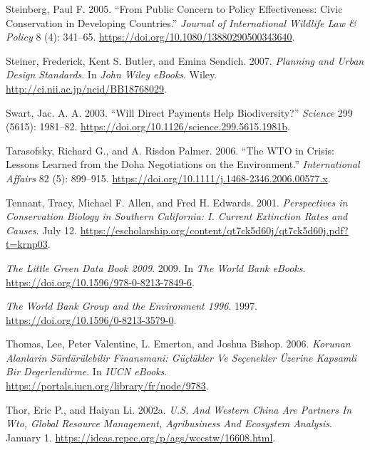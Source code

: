 \begin{CSLReferences}{1}{1}
Steinberg, Paul F. 2005. {``From Public Concern to Policy Effectiveness:
Civic Conservation in Developing Countries.''} \emph{Journal of
International Wildlife Law \& Policy} 8 (4): 341--65.
\url{https://doi.org/10.1080/13880290500343640}.

Steiner, Frederick, Kent S. Butler, and Emina Sendich. 2007.
\emph{Planning and Urban Design Standards}. In \emph{John Wiley eBooks}.
Wiley. \url{http://ci.nii.ac.jp/ncid/BB18768029}.

Swart, Jac. A. A. 2003. {``Will Direct Payments Help Biodiversity?''}
\emph{Science} 299 (5615): 1981--82.
\url{https://doi.org/10.1126/science.299.5615.1981b}.

Tarasofsky, Richard G., and A. Risdon Palmer. 2006. {``The WTO in
Crisis: Lessons Learned from the Doha Negotiations on the
Environment.''} \emph{International Affairs} 82 (5): 899--915.
\url{https://doi.org/10.1111/j.1468-2346.2006.00577.x}.

Tennant, Tracy, Michael F. Allen, and Fred H. Edwards. 2001.
\emph{Perspectives in Conservation Biology in Southern California: I.
Current Extinction Rates and Causes}. July 12.
\url{https://escholarship.org/content/qt7ck5d60j/qt7ck5d60j.pdf?t=krnp03}.

\emph{The Little Green Data Book 2009}. 2009. In \emph{The World Bank
eBooks}. \url{https://doi.org/10.1596/978-0-8213-7849-6}.

\emph{The World Bank Group and the Environment 1996}. 1997.
\url{https://doi.org/10.1596/0-8213-3579-0}.

Thomas, Lee, Peter Valentine, L. Emerton, and Joshua Bishop. 2006.
\emph{Korunan Alanlarin Sürdürülebilir Finansmani: Güçlükler Ve
Seçenekler Üzerine Kapsamli Bir Degerlendirme}. In \emph{IUCN eBooks}.
\url{https://portals.iucn.org/library/fr/node/9783}.

Thor, Eric P., and Haiyan Li. 2002a. \emph{U.S. And Western China Are
Partners In Wto, Global Resource Management, Agribusiness And Ecosystem
Analysis}. January 1.
\url{https://ideas.repec.org/p/ags/wccstw/16608.html}.


\end{CSLReferences}
